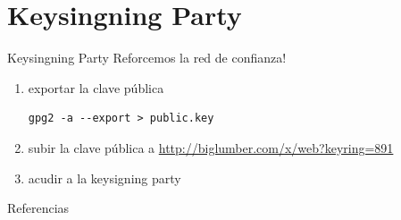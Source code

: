 \documentclass{beamer}
\begin{document}
\section{Keysingning Party}
\begin{frame}[fragile]{Keysingning Party}
Reforcemos la red de confianza!
\begin{enumerate}
    \item exportar la clave pública
        \begin{lstlisting}
gpg2 -a --export > public.key
        \end{lstlisting}
    \item subir la clave pública a \url{http://biglumber.com/x/web?keyring=891}
    \item acudir a la keysigning party
\end{enumerate}
\end{frame}


\begin{frame}[allowframebreaks]{Referencias}
    \nocite{*}
    \printbibliography
\end{frame}
\end{document}
